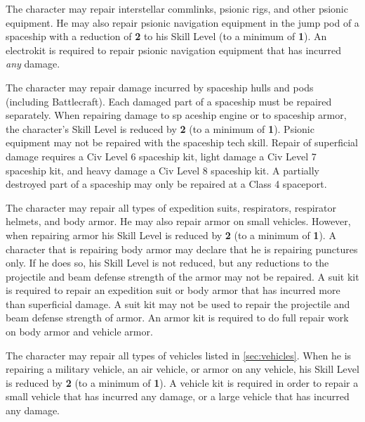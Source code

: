 \label{sec:skill-psion-tech}

The character may repair interstellar commlinks, psionic rigs, and
other psionic equipment.  He may also repair psionic navigation
equipment in the jump pod of a spaceship with a reduction of
\textbf{2} to his Skill Level (to a minimum of \textbf{1}).  An
electrokit is required to repair psionic navigation equipment that has
incurred \emph{any} damage.

\label{sec:skill-spaceship-tech}

The character may repair damage incurred by spaceship hulls and pods
(including Battlecraft).  Each damaged part of a spaceship must be
repaired separately.  When repairing damage to sp aceship engine or to
spaceship armor, the character's Skill Level is reduced by \textbf{2}
(to a minimum of \textbf{1}).  Psionic equipment may not be repaired
with the spaceship tech skill.  Repair of superficial damage requires a
Civ Level 6 spaceship kit, light damage a Civ Level 7 spaceship kit,
and heavy damage a Civ Level 8 spaceship kit.  A partially destroyed
part of a spaceship may only be repaired at a Class 4 spaceport.

\label{sec:skill-suit-tech}

The character may repair all types of expedition suits, respirators,
respirator helmets, and body armor.  He may also repair armor on small
vehicles.  However, when repairing armor his Skill Level is reduced by
\textbf{2} (to a minimum of \textbf{1}).  A character that is repairing
body armor may declare that he is repairing punctures only.  If he does
so, his Skill Level is not reduced, but any reductions to the
projectile and beam defense strength of the armor may not be repaired.
A suit kit is required to repair an expedition suit or body armor that
has incurred more than superficial damage.  A suit kit may not be used
to repair the projectile and beam defense strength of armor.  An armor
kit is required to do full repair work on body armor and vehicle
armor.

\label{sec:skill-vehicle-tech}

The character may repair all types of vehicles listed in
\ref{sec:vehicles}.  When he is repairing a military vehicle, an air
vehicle, or armor on any vehicle, his Skill Level is reduced by
\textbf{2} (to a minimum of \textbf{1}).  A vehicle kit is required in
order to repair a small vehicle that has incurred any damage, or a
large vehicle that has incurred any damage.

